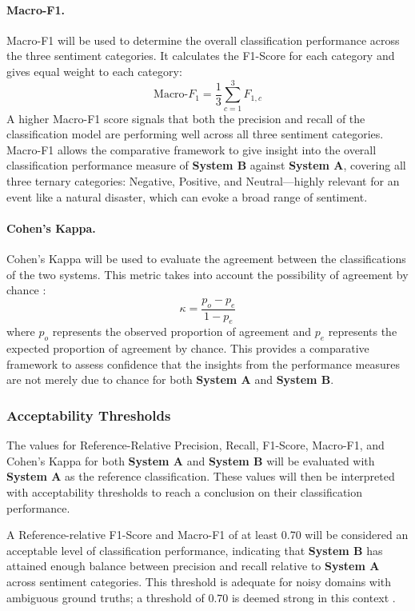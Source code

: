 \documentclass[12pt,a4paper]{report}
\newcommand{\sysA}{\textbf{System A}}
\newcommand{\sysB}{\textbf{System B}}
\begin{document}
\paragraph{Macro-F1.} Macro-F1 will be used to determine the overall
classification performance across the three sentiment categories. It calculates
the F1-Score for each category and gives equal weight to each category:
\begin{equation}
  \text{Macro-}F_1 = \frac{1}{3} \sum_{c=1}^{3} F_{1,c}
  \label{eq:macrof1}
\end{equation}
A higher Macro-F1 score signals that both the precision and recall of the
classification model are performing well across all three sentiment categories.
Macro-F1 allows the comparative framework to give insight into the overall
classification performance measure of \sysB{} against \sysA, covering all three
ternary categories: Negative, Positive, and Neutral---highly relevant for an
event like a natural disaster, which can evoke a broad range of sentiment.

\paragraph{Cohen's Kappa.} Cohen's Kappa will be used to evaluate the agreement
between the classifications of the two systems. This metric takes into account
the possibility of agreement by chance \parencite{mchugh2012}:
\begin{equation}
  \kappa = \frac{p_o - p_e}{1 - p_e}
  \label{eq:kappa}
\end{equation}
where $p_o$ represents the observed proportion of agreement and $p_e$ represents
the expected proportion of agreement by chance. This provides a comparative
framework to assess confidence that the insights from the performance measures
are not merely due to chance for both \sysA{} and \sysB.

\subsubsection{Acceptability Thresholds}

The values for Reference-Relative Precision, Recall, F1-Score, Macro-F1, and
Cohen's Kappa for both \sysA{} and \sysB{} will be evaluated with \sysA{} as the
reference classification. These values will then be interpreted with
acceptability thresholds to reach a conclusion on their classification
performance.

A Reference-relative F1-Score and Macro-F1 of at least 0.70 will be considered
an acceptable level of classification performance, indicating that \sysB{} has
attained enough balance between precision and recall relative to \sysA{} across
sentiment categories. This threshold is adequate for noisy domains with
ambiguous ground truths; a threshold of 0.70 is deemed strong in this context
\parencite{openlayer2026}.
\end{document}
